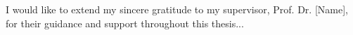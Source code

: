 
I would like to extend my sincere gratitude to my supervisor, Prof. Dr. [Name], for their guidance and support throughout this thesis...
